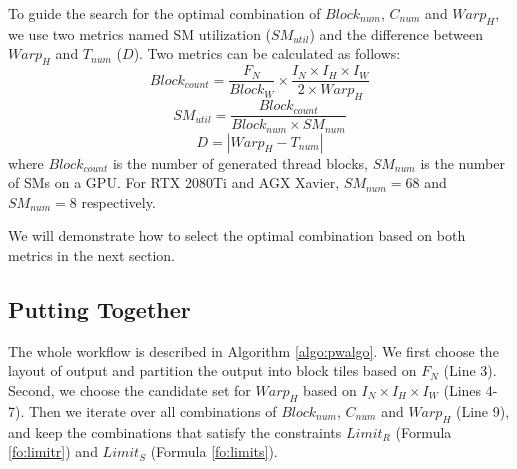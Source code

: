 To guide the search for the optimal combination of $Block_{num}$, $C_{num}$ and $Warp_H$, we use two metrics named SM utilization ($SM_{util}$) and the difference between $Warp_H$ and $T_{num}$ ($D$).
Two metrics can be calculated as follows:
\begin{equation}\nonumber
    Block_{count}=\frac{F_N}{Block_W} \times \frac{I_N \times I_H \times I_W}{2 \times Warp_H}
\end{equation}
\begin{equation}
    SM_{util}=\frac{Block_{count}}{Block_{num}\times SM_{num}}
    \label{fo:smutil}
\end{equation}
\begin{equation}
    D = |Warp_H-T_{num}|
    \label{fo:diff}
\end{equation}
where $Block_{count}$ is the number of generated thread blocks, $SM_{num}$ is the number of SMs on a GPU. For RTX 2080Ti and AGX Xavier, $SM_{num}=68$ and $SM_{num}=8$ respectively.

We will demonstrate how to select the optimal combination based on both metrics in the next section.

\subsection{Putting Together}
The whole workflow is described in Algorithm \ref{algo:pwalgo}.
We first choose the layout of output and partition the output into block tiles based on $F_N$ (Line 3).
Second, we choose the candidate set for $Warp_H$ based on $I_N \times I_H \times I_W$ (Lines 4-7).
Then we iterate over all combinations of $Block_{num}$, $C_{num}$ and $Warp_H$ (Line 9), and keep the combinations that satisfy the constraints $Limit_R$ (Formula \ref{fo:limitr}) and $Limit_S$ (Formula \ref{fo:limits}).

